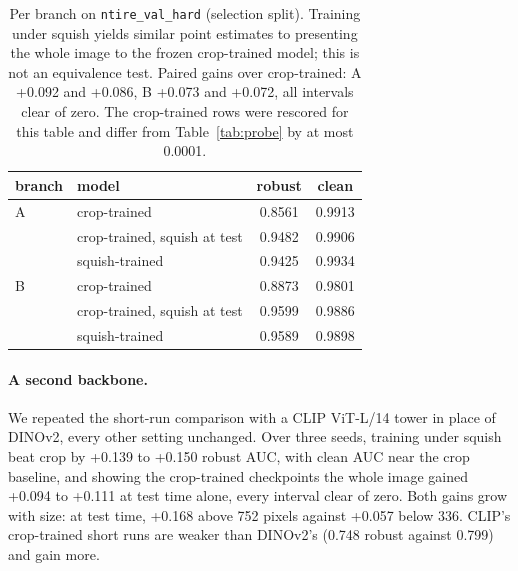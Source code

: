 \documentclass[letterpaper]{article} %
\begin{document}
\begin{table}[t]
\centering
\small
\setlength{\tabcolsep}{4pt}
\begin{tabular}{llcc}
\toprule
branch & model & robust & clean \\
\midrule
A & crop-trained & 0.8561 & 0.9913 \\
  & crop-trained, squish at test & 0.9482 & 0.9906 \\
  & squish-trained & 0.9425 & 0.9934 \\
\midrule
B & crop-trained & 0.8873 & 0.9801 \\
  & crop-trained, squish at test & 0.9599 & 0.9886 \\
  & squish-trained & 0.9589 & 0.9898 \\
\bottomrule
\end{tabular}
\caption{Per branch on \texttt{ntire\_val\_hard} (selection split). Training under
squish yields similar point estimates to presenting the whole image to
the frozen crop-trained model; this is not an equivalence test. Paired gains over crop-trained: A +0.092 and +0.086, B
+0.073 and +0.072, all intervals clear of zero. The crop-trained rows were
rescored for this table and differ from Table~\ref{tab:probe} by at most
0.0001.}
\label{tab:branches}
\end{table}

\paragraph{A second backbone.} We repeated the short-run comparison with a CLIP
ViT-L/14 tower \cite{radford2021clip} in place of DINOv2, every other setting
unchanged. Over three seeds, training under squish beat crop by +0.139 to
+0.150 robust AUC, with clean AUC near the crop baseline, and showing the crop-trained
checkpoints the whole image gained +0.094 to +0.111 at test time alone, every
interval clear of zero. Both gains grow with size: at test time, +0.168 above
752 pixels against +0.057 below 336. CLIP's crop-trained short runs are weaker
than DINOv2's (0.748 robust against 0.799) and gain more.
\end{document}
